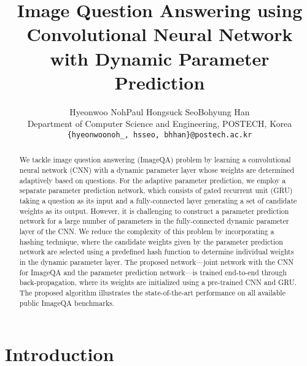\documentclass[10pt,twocolumn,letterpaper]{article}
\begin{document}
\title{Image Question Answering using Convolutional Neural Network \\ with Dynamic Parameter Prediction}


\author{Hyeonwoo Noh\hspace{1.7cm}Paul Hongsuck Seo\hspace{1.7cm}Bohyung Han\\
Department of Computer Science and Engineering, POSTECH, Korea\\
{\tt\small \{hyeonwoonoh\_, hsseo, bhhan\}@postech.ac.kr}}

\maketitle


\begin{abstract}
We tackle image question answering (ImageQA) problem by learning a convolutional neural network (CNN) with a dynamic parameter layer whose weights are determined adaptively based on questions.
For the adaptive parameter prediction, we employ a separate parameter prediction network, which consists of gated recurrent unit (GRU) taking a question as its input and a fully-connected layer generating a set of candidate weights as its output.
However, it is challenging to construct a parameter prediction network for a large number of parameters in the fully-connected dynamic parameter layer of the CNN.
We reduce the complexity of this problem by incorporating a hashing technique, where the candidate weights given by the parameter prediction network are selected using a predefined hash function to determine individual weights in the dynamic parameter layer.
The proposed network---joint network with the CNN for ImageQA and the parameter prediction network---is trained end-to-end through back-propagation, where its weights are initialized using a pre-trained CNN and GRU.
The proposed algorithm illustrates the state-of-the-art performance on all available public ImageQA benchmarks.
\vspace{-0.11cm}
\end{abstract}

\section{Introduction}
\label{sec:introduction}
\end{document}

